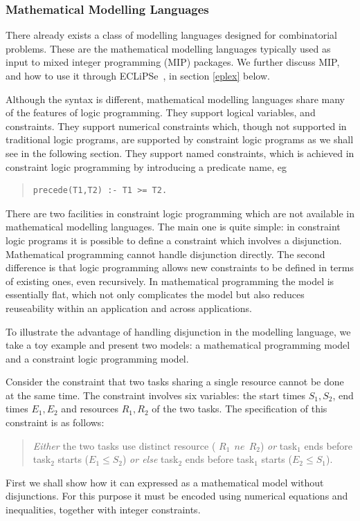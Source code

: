 \documentclass[a4wide]{article}
\newcommand{\ECL}{\mbox{ECLiPSe\ }{\hspace{1mm}}}
\begin{document}
\subsubsection{Mathematical Modelling Languages}
\label{mathconceptual}
There already exists a class of modelling languages designed for
combinatorial problems.
These are the mathematical modelling languages typically used as input
to mixed integer programming (MIP) packages.
We further  discuss MIP, and how to use it through \ECL, in section
\ref{eplex} below. 

Although the syntax is different, mathematical modelling languages
share many of the features of logic programming.
They support logical variables, and constraints.
They support numerical constraints which, though not supported in
traditional logic programs, are supported by constraint logic programs
as we shall see in the following section.
They support named constraints, which is achieved in constraint logic
programming by introducing a predicate name, eg
\begin{quote}\begin{verbatim}
precede(T1,T2) :- T1 >= T2.
\end{verbatim}\end{quote}

There are two facilities in constraint logic programming which are not
available in mathematical modelling languages.
The main one is quite simple: in constraint logic programs it is
possible to define a constraint which involves a disjunction.
Mathematical programming cannot handle disjunction directly.
The second difference is that logic programming allows new constraints
to be defined in terms of existing ones, even recursively.
In mathematical programming the model is essentially flat, which not
only complicates the model but also reduces reuseability within an
application and across applications.

To illustrate the advantage of handling disjunction in the modelling
language, we take a toy example and present two models: a
mathematical programming model and a constraint logic programming
model.

Consider the constraint that two tasks sharing a
single resource cannot be done at the same time.
The constraint involves six variables: the start times $S_1, S_2$, end times
$E_1, E_2$ and resources $R_1, R_2$ of the two tasks.
The specification of this constraint is as follows:
\begin{quotation}
{\em Either} the two tasks use distinct resource ( $R_1\ \  ne\ \  R_2$)
{\em or} task$_1$ ends before task$_2$ starts ($E_1 \leq S_2$)
{\em or else} task$_2$ ends before task$_1$ starts ($ E_2 \leq S_1$).
\end{quotation}
First we shall show how it can expressed as a mathematical model
without disjunctions.
For this purpose it must be encoded using numerical equations
and inequalities, together with integer constraints. 
\end{document}
